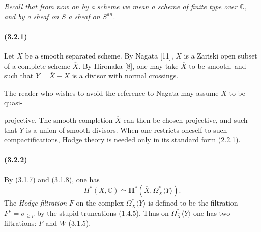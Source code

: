 \documentclass[10pt]{article}
\newcommand{\C}{\mathbb C}
\begin{document}
\emph{Recall that from now on by a scheme we mean a scheme of finite type over $\C$, and by a sheaf on $S$ a sheaf on $S^{an}$.}

\paragraph{(3.2.1)} Let $X$ be a smooth separated scheme. By Nagata [11], $X$ is a Zariski open subset of a complete scheme $\overline X$. By Hironaka [8], one may take $\overline X$ to be smooth, and such that $Y=\overline X-X$ is a divisor with normal crossings.

The reader who wishes to avoid the reference to Nagata may assume $X$ to be quasi-



projective. The smooth completion $\overline X$ can then be chosen projective, and such that $Y$ is a union of smooth divisors. When one restricts oneself to such compactifications, Hodge theory is needed only in its standard form (2.2.1).

\paragraph{(3.2.2)} By (3.1.7) and (3.1.8), one has
\[
H^*(X,\C)\simeq \mathbf H^*(\overline X,\Omega_{\overline X}^{*}\langle Y\rangle).
\]
The \emph{Hodge filtration} $F$ on the complex $\Omega_{\overline X}^{*}\langle Y\rangle$ is defined to be the filtration $F^p=\sigma_{\ge p}$ by the stupid truncations (1.4.5). Thus on $\Omega_{\overline X}^{*}\langle Y\rangle$ one has two filtrations: $F$ and $W$ (3.1.5).
\end{document}
